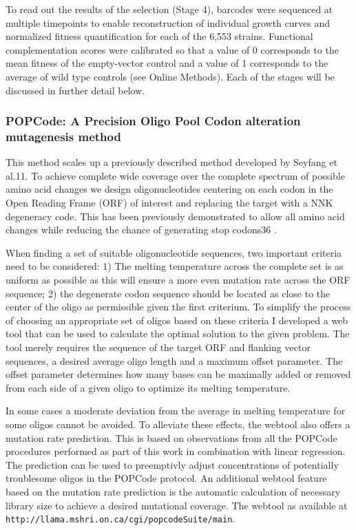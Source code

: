To read out the results of the selection (Stage 4), barcodes were sequenced at multiple timepoints to enable reconstruction of individual growth curves and normalized fitness quantification for each of the 6,553 strains. Functional complementation scores were calibrated so that a value of 0 corresponds to the mean fitness of the empty-vector control and a value of 1 corresponds to the average of wild type controls (see Online Methods). Each of the stages will be discussed in further detail below.



\subsubsection{POPCode: A Precision Oligo Pool Codon alteration mutagenesis method}

This method scales up a previously described method developed by Seyfang et al.11. To achieve complete wide coverage over the complete spectrum of possible amino acid changes we design oligonucleotides centering on each codon in the Open Reading Frame (ORF) of interest and replacing the target with a NNK degeneracy code. This has been previously demonstrated to allow all amino acid changes while reducing the chance of generating stop codons36 . 

When finding a set of suitable oligonucleotide sequences, two important criteria need to be considered: 
1) The melting temperature across the complete set is as uniform as possible as this will ensure a more even mutation rate across the ORF sequence; 2) the degenerate codon sequence should be located as close to the center of the oligo as permissible given the first criterium. To simplify the process of choosing an appropriate set of oligos based on these criteria I developed a web tool that can be used to calculate the optimal solution to the given problem. The tool merely requires the sequence of the target ORF and flanking vector sequences, a desired average oligo length and a maximum offset parameter. The offset parameter determines how many bases can be maximally added or removed from each side of a given oligo to optimize its melting temperature. 

In some cases a moderate deviation from the average in melting temperature for some oligos cannot be avoided. To alleviate these effects, the webtool also offers a mutation rate prediction. This is based on observations from all the POPCode procedures performed as part of this work in combination with linear regression. The prediction can be used to preemptivly adjust concentrations of potentially troublesome oligos in the POPCode protocol. An additional webtool feature based on the mutation rate prediction is the automatic calculation of necessary library size to achieve a desired mutational coverage. The webtool as available at \verb|http://llama.mshri.on.ca/cgi/popcodeSuite/main|.

